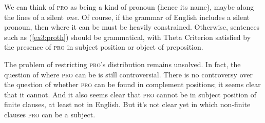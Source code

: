 We can think of \textsc{pro} as being a kind of pronoun (hence its name), maybe along the lines of a silent \emph{one}. Of course, if the grammar of English includes a silent pronoun, then where it can be must be heavily constrained. Otherwise, sentences such as (\ref{ex3:proth}) should be grammatical, with Theta Criterion satisfied by the presence of \textsc{pro} in subject position or object of preposition.
\begin{exe}
\ex \label{ex3:proth} 
\begin{xlist}
\end{xlist}
\end{exe}
The problem of restricting \textsc{pro}'s distribution remains unsolved. In fact, the question of where \textsc{pro} can be is still controversial. There is no controversy over the question of whether \textsc{pro} can be found in complement positions; it seems clear that it cannot. And it also seems clear that \textsc{pro} cannot be in subject position of finite clauses, at least not in English. But it's not clear yet in which non-finite clauses \textsc{pro} can be a subject.

